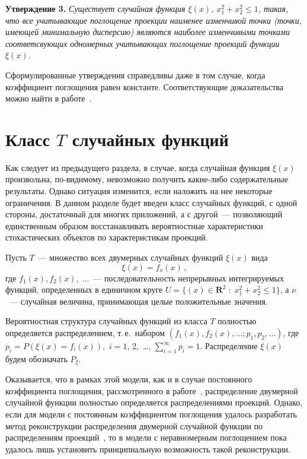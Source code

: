 \begin{multicols}{2}
\smallskip
\noindent
\textbf{Утверждение 3.} 
\textit{Существует случайная функция $\xi(x)$,
$x_1^2+x_2^2\leq 1$, такая, что все учитывающие поглощение
проекции наименее изменчивой точки (точки, имеющей минимальную
дисперсию) являются наиболее изменчивыми точками соответсвующих
одномерных учитывающих поглощение проекций функции $\xi(x)$.}

\smallskip

Сформулированные утверждения справедливы даже в том случае, когда
коэффициент поглощения равен константе. Соответствующие
доказательства можно найти в работе~\cite{7u}.

\section{Класс $T$ случайных функций}

Как следует из предыдущего раздела, в случае, когда случайная
функция $\xi(x)$ произвольна, по-ви\-ди\-мо\-му, невозможно получить
какие-либо содержательные результаты. Однако ситуация изменится,
если наложить на нее некоторые ограничения. В данном разделе будет введен
 класс случайных функций, с одной стороны, достаточный для
многих приложений, а с другой~--- позволяющий единственным образом
восстанавливать вероятностные характеристики стохастических
объектов по характеристикам проекций.

Пусть $T$~--- множество всех двумерных случайных функций
$\xi(x)$ вида 
$$
\xi(x) = f_{\nu}(x)\,,
$$ 
где
$f_{1}(x),f_{2}(x),\;\ldots$~--- последовательность непрерывных
интегрируемых функций, определенных в единичном круге
$U=\{(x)\in\mathbf{R}^{2}\; : \;x_{1}^{2}+x_{2}^{2}\leq1\}$, а
$\nu$~--- случайная величина, принимающая целые положительные значения.

Вероятностная структура случайных функций из класса $T$ полностью определяется распределением,
т.\,е.\ набором 
$(f_{1}(x),f_{2}(x),\ldots;p_{1},p_{2},\ldots)$,
где $p_{i}=P(\xi(x) = f_{i}(x)),$ $i = 1$, 2,\ \ldots, 
$\sum\limits_{i=1}^{\infty}p_{i} = 1$. Распределение $\xi(x)$ будем
обозначать $P_\xi$.

Оказывается, что в рамках этой модели, как и в случае постоянного
коэффициента поглощения, рассмотренного в работе~\cite{7u},
распределение двумерной случайной функции полностью определяется
распределениями проекций. Однако, если для модели с постоянным
коэффициентом поглощения удалось разработать метод
реконструкции распределения двумерной случайной функции по
распределениям проекций~\cite{8u}, то в модели с неравномерным
поглощением пока удалось лишь установить принципиальную
возможность такой реконструкции.


\end{multicols}
